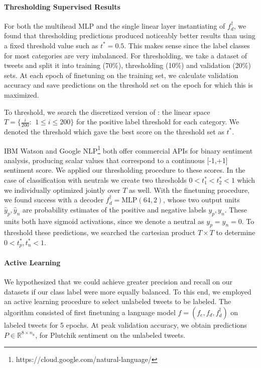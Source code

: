 \documentclass[letterpaper]{article} %
\begin{document}
\paragraph{Thresholding Supervised Results}
For both the multihead MLP and the single linear layer instantiating of $f_d^{\dagger}$, we found that thresholding predictions produced noticeably better results than using a fixed threshold value such as $t^* = 0.5$. This makes sense since the label classes for most categories are very imbalanced. For thresholding, we take a dataset of tweets and split it into training (70\%), thresholding (10\%) and validation (20\%) sets. At each epoch of finetuning on the training set, we calculate validation accuracy and save predictions on the threshold set on the epoch for which this is maximized.

To threshold, we search the discretized version of \text{[0, 1]}: the linear space $T = \{ \frac{i}{200}: \, \: 1 \le i \le 200 \}$ for the positive label threshold for each category. We denoted the threshold which gave the best score on the threshold set as $t^*$.

IBM Watson and Google NLP\footnote{https://cloud.google.com/natural-language/} both offer commercial APIs for binary sentiment analysis, producing scalar values that correspond to a continuous [-1,+1] sentiment score. We applied our thresholding procedure to these scores. In the case of classification with neutrals we create two thresholds $0 < t_1^* < t_2^* < 1$ which we individually optimized jointly over $T$ as well. With the finetuning procedure, we found success with a decoder $f_d^{\dagger} = \text{MLP}(64, 2)$, whose two output units $\hat{y}_p, \hat{y}_n$ are probability estimates of the positive and negative labels $y_p, y_n$. These units both have sigmoid activations, since we denote a neutral as $y_p = y_n = 0$. To threshold these predictions, we searched the cartesian product $T \times T$ to determine $0 < t_p^*, t_n^* < 1$.

\paragraph{Active Learning}
We hypothesized that we could achieve greater precision and recall on our datasets if our class label were more equally balanced. To this end, we employed an active learning procedure to select unlabeled tweets to be labeled. The algorithm consisted of first finetuning a language model $f = (f_e, f_d, f_d^{\dagger})$ on labeled tweets for 5 epochs. At peak validation accuracy, we obtain predictions $P \in \mathbb{R}^{8 \times n_{u}}$, for Plutchik sentiment on the unlabeled tweets.
\end{document}
